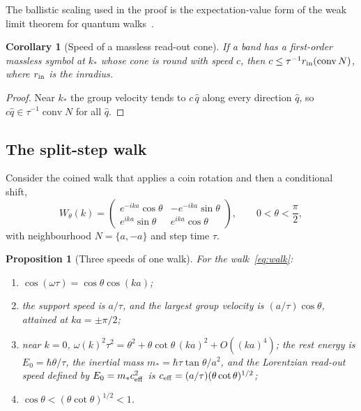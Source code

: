 \documentclass[12pt]{article}
\newtheorem{proposition}[theorem]{Proposition}
\newtheorem{corollary}[theorem]{Corollary}
\theoremstyle{definition}
\theoremstyle{remark}
\newcommand{\conv}{\operatorname{conv}}
\begin{document}
The ballistic scaling used in the proof is the expectation-value form of the weak limit theorem for quantum walks~\cite{GrimmettJansonScudo2004}.

\begin{corollary}[Speed of a massless read-out cone]
\label{cor:inradius}
If a band has a first-order massless symbol at $k_*$ whose cone is round with speed $c$, then $c\le\tau^{-1}r_{\rm in}(\conv N)$, where $r_{\rm in}$ is the inradius.
\end{corollary}

\begin{proof}
Near $k_*$ the group velocity tends to $c\,\hat q$ along every direction $\hat q$, so $c\hat q\in\tau^{-1}\conv N$ for all $\hat q$.
\end{proof}

\subsection{The split-step walk}
\label{sec:walk}

Consider the coined walk that applies a coin rotation and then a conditional shift,
\begin{equation}
W_\theta(k)=\begin{pmatrix}e^{-ika}\cos\theta&-e^{-ika}\sin\theta\\ e^{ika}\sin\theta&e^{ika}\cos\theta\end{pmatrix},\qquad 0<\theta<\frac\pi2,
\label{eq:walk}
\end{equation}
with neighbourhood $N=\{a,-a\}$ and step time $\tau$.

\begin{proposition}[Three speeds of one walk]
\label{prop:walk}
For the walk~\eqref{eq:walk}:
\begin{enumerate}
\item $\cos(\omega\tau)=\cos\theta\cos(ka)$;
\item the support speed is $a/\tau$, and the largest group velocity is $(a/\tau)\cos\theta$, attained at $ka=\pm\pi/2$;
\item near $k=0$, $\omega(k)^2\tau^2=\theta^2+\theta\cot\theta\,(ka)^2+O((ka)^4)$; the rest energy is $E_0=\hbar\theta/\tau$, the inertial mass $m_*=\hbar\tau\tan\theta/a^2$, and the Lorentzian read-out speed defined by $E_0=m_*c_{\rm eff}^2$ is $c_{\rm eff}=(a/\tau)(\theta\cot\theta)^{1/2}$;
\item $\cos\theta<(\theta\cot\theta)^{1/2}<1$.
\end{enumerate}
\end{proposition}
\end{document}
